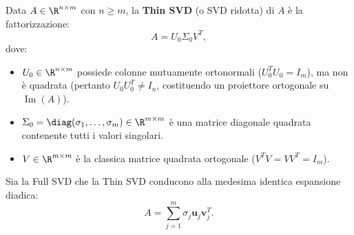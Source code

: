 \begin{definition}
\label{def:thin-svd}
Data $A \in \R^{n \times m}$ con $n \ge m$, la \textbf{Thin SVD} (o SVD ridotta) di $A$ \`e la fattorizzazione:
\begin{equation}
    A = U_0 \Sigma_0 V^T,
\end{equation}
dove:
\begin{itemize}
    \item $U_0 \in \R^{n \times m}$ possiede colonne mutuamente ortonormali ($U_0^T U_0 = I_m$), ma non \`e quadrata (pertanto $U_0 U_0^T \neq I_n$, costituendo un proiettore ortogonale su $\operatorname{Im}(A)$).
    \item $\Sigma_0 = \diag(\sigma_1, \dots, \sigma_m) \in \R^{m \times m}$ \`e una matrice diagonale quadrata contenente tutti i valori singolari.
    \item $V \in \R^{m \times m}$ \`e la classica matrice quadrata ortogonale ($V^T V = V V^T = I_m$).
\end{itemize}
\end{definition}

Sia la Full SVD che la Thin SVD conducono alla medesima identica espansione diadica:
\begin{equation}
    A = \sum_{j=1}^m \sigma_j \mathbf{u}_j \mathbf{v}_j^T.
\end{equation}

